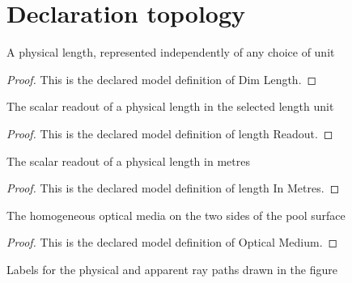 \section{Declaration topology}
\begin{definition}
  \label{def:physics:phyx-mini-0137:phyxminiproblems-problemphyxmini0137-dimlength}
  A physical length, represented independently of any choice of unit
\end{definition}
\begin{proof}
  This is the declared model definition of Dim Length.
\end{proof}
\begin{definition}
  \label{def:physics:phyx-mini-0137:phyxminiproblems-problemphyxmini0137-lengthreadout}
  The scalar readout of a physical length in the selected length unit
\end{definition}
\begin{proof}
  This is the declared model definition of length Readout.
\end{proof}
\begin{definition}
  \label{def:physics:phyx-mini-0137:phyxminiproblems-problemphyxmini0137-lengthinmetres}
  The scalar readout of a physical length in metres
\end{definition}
\begin{proof}
  This is the declared model definition of length In Metres.
\end{proof}
\begin{definition}
  \label{def:physics:phyx-mini-0137:phyxminiproblems-problemphyxmini0137-opticalmedium}
  The homogeneous optical media on the two sides of the pool surface
\end{definition}
\begin{proof}
  This is the declared model definition of Optical Medium.
\end{proof}
\begin{definition}
  \label{def:physics:phyx-mini-0137:phyxminiproblems-problemphyxmini0137-raypathlabel}
  Labels for the physical and apparent ray paths drawn in the figure
\end{definition}
